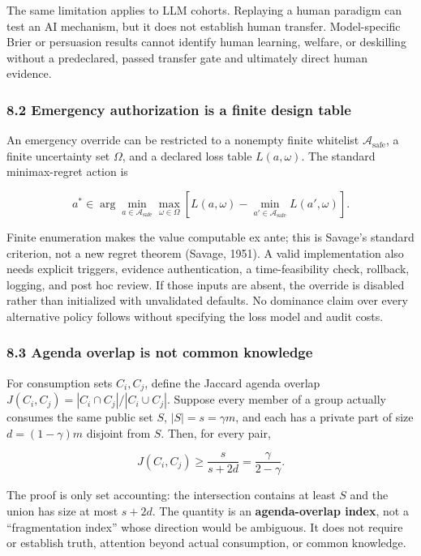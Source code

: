 \documentclass[
  11pt]{article}
\begin{document}
The same limitation applies to LLM cohorts. Replaying a human paradigm
can test an AI mechanism, but it does not establish human transfer.
Model-specific Brier or persuasion results cannot identify human
learning, welfare, or deskilling without a predeclared, passed transfer
gate and ultimately direct human evidence.

\subsubsection{8.2 Emergency authorization is a finite design
table}\label{emergency-authorization-is-a-finite-design-table}

An emergency override can be restricted to a nonempty finite whitelist
\(\mathcal A_{\mathrm{safe}}\), a finite uncertainty set \(\Omega\), and
a declared loss table \(L(a,\omega)\). The standard minimax-regret
action is

\[a^*\in\arg\min_{a\in\mathcal A_{\mathrm{safe}}}\max_{\omega\in\Omega}\left[L(a,\omega)-\min_{a'\in\mathcal A_{\mathrm{safe}}}L(a',\omega)\right].\]

Finite enumeration makes the value computable ex ante; this is Savage's
standard criterion, not a new regret theorem (Savage, 1951). A valid
implementation also needs explicit triggers, evidence authentication, a
time-feasibility check, rollback, logging, and post hoc review. If those
inputs are absent, the override is disabled rather than initialized with
unvalidated defaults. No dominance claim over every alternative policy
follows without specifying the loss model and audit costs.

\subsubsection{8.3 Agenda overlap is not common
knowledge}\label{agenda-overlap-is-not-common-knowledge}

For consumption sets \(C_i,C_j\), define the Jaccard agenda overlap
\(J(C_i,C_j)=|C_i\cap C_j|/|C_i\cup C_j|\). Suppose every member of a
group actually consumes the same public set \(S\), \(|S|=s=\gamma m\),
and each has a private part of size \(d=(1-\gamma)m\) disjoint from
\(S\). Then, for every pair,

\[J(C_i,C_j)\ge\frac{s}{s+2d}=\frac{\gamma}{2-\gamma}.\]

The proof is only set accounting: the intersection contains at least
\(S\) and the union has size at most \(s+2d\). The quantity is an
\textbf{agenda-overlap index}, not a ``fragmentation index'' whose
direction would be ambiguous. It does not require or establish truth,
attention beyond actual consumption, or common knowledge.
\end{document}
